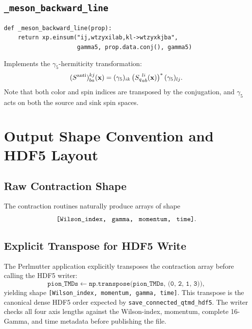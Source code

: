 \documentclass[11pt,a4paper]{article}
\begin{document}
\subsection{\texttt{\_meson\_backward\_line}}

\begin{lstlisting}
def _meson_backward_line(prop):
    return xp.einsum("ij,wtzyxilab,kl->wtzyxkjba",
                     gamma5, prop.data.conj(), gamma5)
\end{lstlisting}

Implements the $\gamma_5$-hermiticity transformation:
\begin{equation}
  (S^{\rm anti})^{k j}_{b a}(\mathbf{x})
  =
  (\gamma_5)_{i k}\,
  \bigl({S_q}^{l i}_{a b}(\mathbf{x})\bigr)^*\,
  (\gamma_5)_{l j}.
\end{equation}
Note that both color and spin indices are transposed by the conjugation, and
$\gamma_5$ acts on both the source and sink spin spaces.

\section{Output Shape Convention and HDF5 Layout}
\label{sec:output}

\subsection{Raw Contraction Shape}

The contraction routines naturally produce arrays of shape
\begin{equation}
  \texttt{[Wilson\_index,\; gamma,\; momentum,\; time]}.
\end{equation}

\subsection{Explicit Transpose for HDF5 Write}

The Perlmutter application explicitly transposes the contraction array before
calling the HDF5 writer:
\begin{equation}
  \texttt{pion\_TMDs} \leftarrow
  \texttt{np.transpose(pion\_TMDs, (0, 2, 1, 3))},
\end{equation}
yielding shape \texttt{[Wilson\_index,\; momentum,\; gamma,\; time]}.  This
transpose is the canonical dense HDF5 order expected by
\verb|save_connected_qtmd_hdf5|.  The writer checks all four axis lengths
against the Wilson-index, momentum, complete 16-Gamma, and time metadata before
publishing the file.
\end{document}
